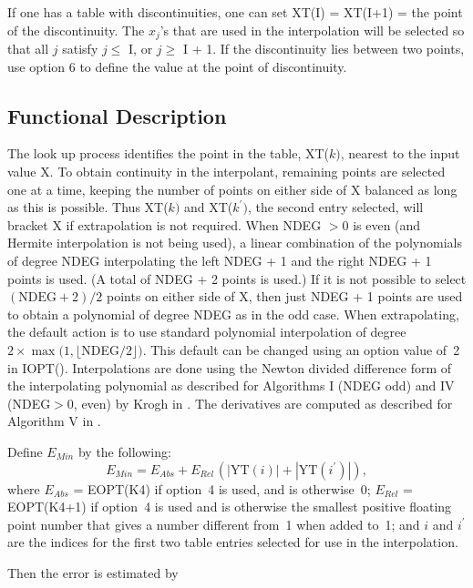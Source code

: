 \documentclass[twoside]{MATH77}
\begin{document}
If one has a table with discontinuities, one can set XT(I) = XT(I+1) =
the point of the discontinuity. The $x_j$'s that are used in the
interpolation will be selected so that all $j$ satisfy $j \leq $ I, or
$j \geq$ I + 1.  If the discontinuity lies between two points, use
option 6 to define the value at the point of discontinuity.

\subsection{Functional Description}

The look up process identifies the point in the table, XT($k)$, nearest to
the input value X.  To obtain continuity in the interpolant, remaining
points are selected one at a time, keeping the number of points on either
side of X balanced as long as this is possible.  Thus XT($k)$ and
XT($k^{\prime})$, the second entry selected, will bracket X if
extrapolation is not required.  When NDEG $>0$ is even (and Hermite
interpolation is not being used), a linear combination of the polynomials
of degree NDEG interpolating the left NDEG + 1 and the right NDEG + 1
points is used.  (A total of NDEG + 2 points is used.) If it is not
possible to select $(\text{NDEG}+2) / 2$ points on either side of X, then
just NDEG + 1 points are used to obtain a polynomial of degree NDEG as in
the odd case.  When extrapolating, the default action is to use standard
polynomial interpolation of degree $2\times \max (1,\lfloor
$NDEG$/2\rfloor )$.  This default can be changed using an option value
of~2 in IOPT().  Interpolations are done using the Newton divided
difference form of the interpolating polynomial as described for
Algorithms I (NDEG odd) and IV (NDEG$>0$, even) by Krogh in
\cite{Krogh:1970:EAP}.  The derivatives are computed as described for
Algorithm V in \cite{Krogh:1970:EAP}.

Define $E_{Min}$ by the following:
\begin{equation*}
E_{Min}=E_{Abs}+E_{Rel\,}(|\text{YT}(i)|+|\text{YT}(i^{\prime })|),
\end{equation*}
where $E_{Abs}$ = EOPT(K4) if option~4 is used, and is otherwise~0; $E_{Rel}$
= EOPT(K4+1) if option~4 is used and is otherwise the smallest positive
floating point number that gives a number different from~1 when added to~1;
and $i$ and $i^{\prime}$ are the indices for the first two table entries
selected for use in the interpolation.

Then the error is estimated by
\end{document}
